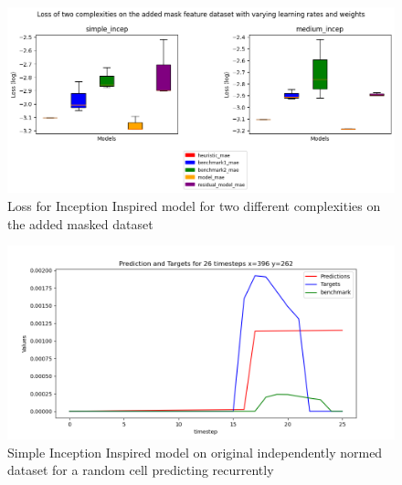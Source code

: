 \begin{figure}[tbph]
	\centering
	\includegraphics[width=0.8\linewidth, height=0.3\textheight]{Figures/Results/Inception_model/mask_dataset}
	\caption[Loss for Inception Inspired model for two different complexities on the added mask dataset]{Loss for Inception Inspired model for two different complexities on the added masked dataset}
	\label{fig:incep-maskdset}
\end{figure}

\begin{figure}[tbph]
	\centering
	\includegraphics[width=0.8\linewidth, height=0.3\textheight]{Figures/Results/Inception_model/simple_incep_train_5_custom_mae_weighted_10_norm_independant_normal_292_random_cell_residual}
	\caption[Simple Inception Inspired model on original independently normed dataset]{Simple Inception Inspired model on original independently normed dataset for a random cell predicting recurrently}
	\label{fig:eg-simpincep}
\end{figure}


